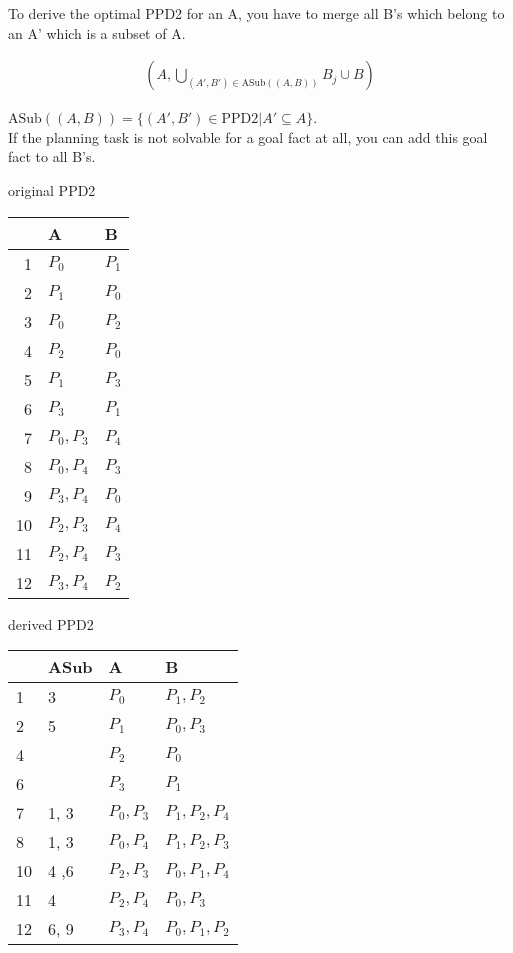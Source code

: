 \documentclass[12pt]{article}
\begin{document}
\noindent
To derive the optimal PPD2 for an A, you have to merge all B's which belong 
to an A' which is a subset of A. 

\begin{align*}
	(A, \bigcup_{(A', B') \in \text{ASub}((A, B))} B_j \cup B)
\end{align*}

\noindent
$\text{ASub}((A, B)) = \{(A', B') \in \text{PPD2}| A' \subseteq A\}$.\\

\noindent
If the planning task is not solvable for a goal fact at all, you can add 
this goal fact to all B's.\\

\begin{minipage}[t]{0.35\textwidth}
	\centering
	original PPD2\\
	\begin{tabular}{r|l|l}
		& A & B \\\hline
		1 & $P_0$ & $P_1$ \\
		2 & $P_1$ & $P_0$ \\
		3 & $P_0$ & $P_2$ \\
		4 & $P_2$ & $P_0$ \\
		5 & $P_1$ & $P_3$ \\
		6 & $P_3$ & $P_1$ \\
		7 & $P_0, P_3$ & $P_4$ \\
		8 & $P_0, P_4$ & $P_3$ \\
		9 & $P_3, P_4$ & $P_0$ \\
		10 & $P_2, P_3$ & $P_4$ \\
		11 & $P_2, P_4$ & $P_3$ \\
		12 & $P_3, P_4$ & $P_2$ \\
	\end{tabular}
\end{minipage}
\hfill
\begin{minipage}[t]{0.55\textwidth}
	\centering
	derived PPD2\\
	\begin{tabular}{l|l|l|l}
		& ASub & A & B \\\hline
		1 & 3 & $P_0$ & $P_1, P_2$ \\
		2 & 5 & $P_1$ & $P_0, P_3$ \\
		4 & & $P_2$ & $P_0$ \\
		6 & & $P_3$ & $P_1$ \\
		7 & 1, 3 & $P_0, P_3$ & $P_1, P_2, P_4$ \\
		8 & 1, 3 & $P_0, P_4$ & $P_1, P_2, P_3$ \\
		10 & 4 ,6 & $P_2, P_3$ & $P_0, P_1, P_4$ \\
		11 & 4 & $P_2, P_4$ & $P_0, P_3$ \\
		12 & 6, 9 & $P_3, P_4$ & $P_0, P_1, P_2$ \\	
	\end{tabular}
\end{minipage}
\end{document}
